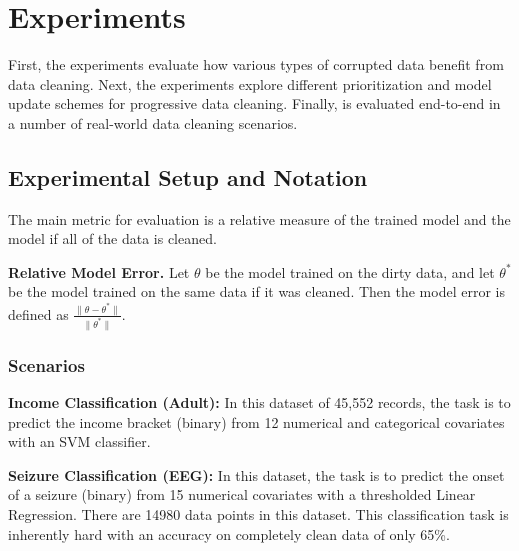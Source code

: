 
\section{Experiments}\label{eval}
First, the experiments evaluate how various types of corrupted data benefit from data cleaning.
Next, the experiments explore different prioritization and model update schemes for progressive data cleaning.
Finally, \sys is evaluated end-to-end in a number of real-world data cleaning scenarios.

\subsection{Experimental Setup and Notation}
The main metric for evaluation is a relative measure of the trained model and the model if all of the data is cleaned.

\vspace{0.5em}

\noindent\textbf{Relative Model Error. } Let $\theta$ be the model trained on the dirty data, and let $\theta^*$ be the model trained on the same data if it was cleaned. Then the model error is defined as $\frac{\|\theta - \theta^*\|}{\|\theta^*\|}$.

\subsubsection{Scenarios}


\vspace{0.25em}

\noindent\textbf{Income Classification (Adult): } In this dataset of 45,552 records, the task is to predict the income bracket (binary) from 12 numerical and categorical covariates with an SVM classifier. 

\vspace{0.25em}

\noindent\textbf{Seizure Classification (EEG): } In this dataset, the task is to predict the onset of a seizure (binary) from 15 numerical covariates with a thresholded Linear Regression. There are 14980 data points in this dataset. This classification task is inherently hard with an accuracy on completely clean data of only 65\%.

